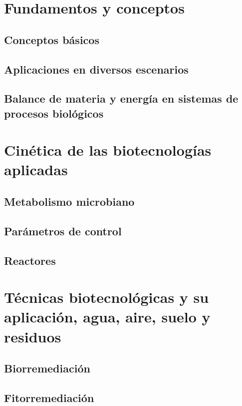\documentclass{../summarie}
\begin{document}
\Portada
\Indice
\fancystyle
\onehalfspacing


\part{Fundamentos y conceptos}

    \chapter{Conceptos básicos}
    \chapter{Aplicaciones en diversos escenarios}
    \chapter{Balance de materia y energía en sistemas de procesos biológicos}

\part{Cinética de las biotecnologías aplicadas}

    \chapter{Metabolismo microbiano}
    \chapter{Parámetros de control}
    \chapter{Reactores}

\part{Técnicas biotecnológicas y su aplicación, agua, aire, suelo y residuos}

    \chapter{Biorremediación}
    \chapter{Fitorremediación}
\end{document}
